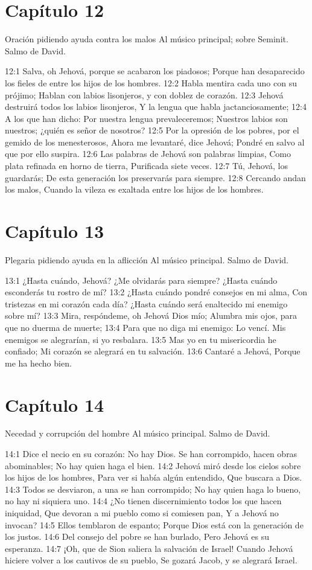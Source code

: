 \section*{Capítulo 12}
Oración pidiendo ayuda contra los malos 
Al músico principal; sobre Seminit. Salmo de David. 

12:1 Salva, oh Jehová, porque se acabaron los piadosos; 
Porque han desaparecido los fieles de entre los hijos de los hombres. 
12:2 Habla mentira cada uno con su prójimo; 
Hablan con labios lisonjeros, y con doblez de corazón. 
12:3 Jehová destruirá todos los labios lisonjeros, 
Y la lengua que habla jactanciosamente; 
12:4 A los que han dicho: Por nuestra lengua prevaleceremos; 
Nuestros labios son nuestros; ¿quién es señor de nosotros? 
12:5 Por la opresión de los pobres, por el gemido de los menesterosos, 
Ahora me levantaré, dice Jehová; 
Pondré en salvo al que por ello suspira. 
12:6 Las palabras de Jehová son palabras limpias, 
Como plata refinada en horno de tierra, 
Purificada siete veces. 
12:7 Tú, Jehová, los guardarás; 
De esta generación los preservarás para siempre. 
12:8 Cercando andan los malos, 
Cuando la vileza es exaltada entre los hijos de los hombres. 
\section*{Capítulo 13}
Plegaria pidiendo ayuda en la aflicción 
Al músico principal. Salmo de David. 

13:1 ¿Hasta cuándo, Jehová? ¿Me olvidarás para siempre? 
¿Hasta cuándo esconderás tu rostro de mí? 
13:2 ¿Hasta cuándo pondré consejos en mi alma, 
Con tristezas en mi corazón cada día? 
¿Hasta cuándo será enaltecido mi enemigo sobre mí? 
13:3 Mira, respóndeme, oh Jehová Dios mío; 
Alumbra mis ojos, para que no duerma de muerte; 
13:4 Para que no diga mi enemigo: Lo vencí. 
Mis enemigos se alegrarían, si yo resbalara. 
13:5 Mas yo en tu misericordia he confiado; 
Mi corazón se alegrará en tu salvación. 
13:6 Cantaré a Jehová, 
Porque me ha hecho bien. 
\section*{Capítulo 14}
Necedad y corrupción del hombre 
Al músico principal. Salmo de David. 

14:1 Dice el necio en su corazón: 
No hay Dios. 
Se han corrompido, hacen obras abominables; 
No hay quien haga el bien. 
14:2 Jehová miró desde los cielos sobre los hijos de los hombres, 
Para ver si había algún entendido, 
Que buscara a Dios. 
14:3 Todos se desviaron, a una se han corrompido; 
No hay quien haga lo bueno, no hay ni siquiera uno. 
14:4 ¿No tienen discernimiento todos los que hacen iniquidad, 
Que devoran a mi pueblo como si comiesen pan, 
Y a Jehová no invocan? 
14:5 Ellos temblaron de espanto; 
Porque Dios está con la generación de los justos. 
14:6 Del consejo del pobre se han burlado, 
Pero Jehová es su esperanza. 
14:7 ¡Oh, que de Sion saliera la salvación de Israel! 
Cuando Jehová hiciere volver a los cautivos de su pueblo, 
Se gozará Jacob, y se alegrará Israel. 
